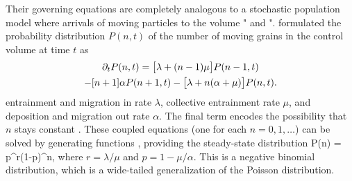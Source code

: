 Their governing equations are completely analogous to a stochastic population model \citep{Cox1965, Pielou1977} where arrivals of moving particles to the volume \DIFdelbegin {}\DIFdelend \DIFaddbegin {}\DIFaddend " and \DIFdelbegin {}\DIFdelend \DIFaddbegin {}\DIFaddend ".
\DIFdelbegin {}\DIFdelend \DIFaddbegin {}\DIFaddend formulated the probability distribution $P(n,t)$ of the number of moving grains in the control volume at time $t$ as
\DIFdelbegin %
\DIFdelend \DIFaddbegin \begin{multline} \partial_t P(n,t) = \big[\lambda + (n-1)\mu\big] P(n-1,t) \\ - [n+1]\alpha P(n+1,t) - \big[\lambda + n (\alpha + \mu)\big]P(n,t).\end{multline}\DIFaddend 
\DIFdelbegin {}\DIFdelend \DIFaddbegin {}\DIFaddend entrainment and migration in \DIFdelbegin {}\DIFdelend \DIFaddbegin {}\DIFaddend rate $\lambda$, collective entrainment \DIFdelbegin {}\DIFdelend \DIFaddbegin {}\DIFaddend rate $\mu$, and \DIFdelbegin {}\DIFdelend deposition and migration out \DIFdelbegin {}\DIFdelend \DIFaddbegin {}\DIFaddend rate $\alpha$.
The final term encodes the possibility that $n$ stays constant \DIFaddbegin {}\DIFaddend .
These coupled equations (one for each $n=0,1,\dots$) can be solved by generating functions \citep{Cox1965}, providing the steady-state distribution
\be P(n) = p^r(1-p)^n, \label{eq:negbin}\ee
where $r = \lambda/\mu$ and $p = 1-\mu/\alpha$.
This is a negative binomial distribution, which is a wide-tailed generalization of the Poisson distribution.

